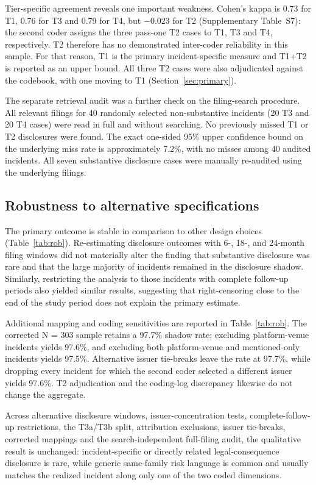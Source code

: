 \documentclass[utf8]{FrontiersinHarvard}
\begin{document}
Tier-specific agreement reveals one important weakness. Cohen's kappa is 0.73 for T1, 0.76 for T3 and 0.79 for T4, but $-0.023$ for T2 (Supplementary Table~S7): the second coder assigns the three pass-one T2 cases to T1, T3 and T4, respectively. T2 therefore has no demonstrated inter-coder reliability in this sample. For that reason, T1 is the primary incident-specific measure and T1+T2 is reported as an upper bound. All three T2 cases were also adjudicated against the codebook, with one moving to T1 (Section~\ref{sec:primary}).

The separate retrieval audit was a further check on the filing-search procedure. All relevant filings for 40 randomly selected non-substantive incidents (20 T3 and 20 T4 cases) were read in full and without searching. No previously missed T1 or T2 disclosures were found. The exact one-sided 95\% upper confidence bound on the underlying miss rate is approximately 7.2\%, with no misses among 40 audited incidents. All seven substantive disclosure cases were manually re-audited using the underlying filings.

\subsection{Robustness to alternative specifications}
The primary outcome is stable in comparison to other design choices (Table~\ref{tab:rob}). Re-estimating disclosure outcomes with 6-, 18-, and 24-month filing windows did not materially alter the finding that substantive disclosure was rare and that the large majority of incidents remained in the disclosure shadow. Similarly, restricting the analysis to those incidents with complete follow-up periods also yielded similar results, suggesting that right-censoring close to the end of the study period does not explain the primary estimate.

Additional mapping and coding sensitivities are reported in Table~\ref{tab:rob}. The corrected N = 303 sample retains a 97.7\% shadow rate; excluding platform-venue incidents yields 97.6\%, and excluding both platform-venue and mentioned-only incidents yields 97.5\%. Alternative issuer tie-breaks leave the rate at 97.7\%, while dropping every incident for which the second coder selected a different issuer yields 97.6\%. T2 adjudication and the coding-log discrepancy likewise do not change the aggregate.

Across alternative disclosure windows, issuer-concentration tests, complete-follow-up restrictions, the T3a/T3b split, attribution exclusions, issuer tie-breaks, corrected mappings and the search-independent full-filing audit, the qualitative result is unchanged: incident-specific or directly related legal-consequence disclosure is rare, while generic same-family risk language is common and usually matches the realized incident along only one of the two coded dimensions.
\end{document}
